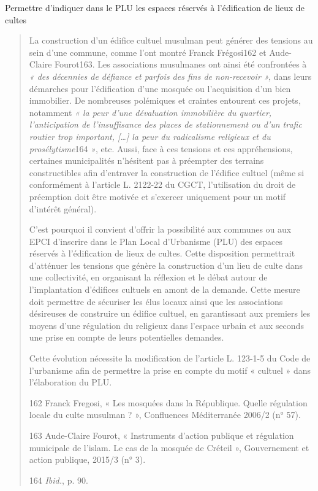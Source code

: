 Permettre d'indiquer dans le PLU les espaces réservés à l'édification de
lieux de cultes

\begin{quote}
La construction d'un édifice cultuel musulman peut générer des tensions
au sein d'une commune, comme l'ont montré Franck Frégosi162 et
Aude-Claire Fourot163. Les associations musulmanes ont ainsi été
confrontées à \emph{« des décennies de défiance et parfois des fins de
non-recevoir »,} dans leurs démarches pour l'édification d'une mosquée
ou l'acquisition d'un bien immobilier. De nombreuses polémiques et
craintes entourent ces projets, notamment \emph{« la peur d'une
dévaluation immobilière du quartier, l'anticipation de l'insuffisance
des places de stationnement ou d'un trafic routier trop important,
{[}\ldots{]} la peur du radicalisme religieux et du prosélytisme}164
\emph{»}, etc. Aussi, face à ces tensions et ces appréhensions,
certaines municipalités n'hésitent pas à préempter des terrains
constructibles afin d'entraver la construction de l'édifice cultuel
(même si conformément à l'article L. 2122-22 du CGCT, l'utilisation du
droit de préemption doit être motivée et s'exercer uniquement pour un
motif d'intérêt général).

C'est pourquoi il convient d'offrir la possibilité aux communes ou aux
EPCI d'inscrire dans le Plan Local d'Urbanisme (PLU) des espaces
réservés à l'édification de lieux de cultes. Cette disposition
permettrait d'atténuer les tensions que génère la construction d'un lieu
de culte dans une collectivité, en organisant la réflexion et le débat
autour de l'implantation d'édifices cultuels en amont de la demande.
Cette mesure doit permettre de sécuriser les élus locaux ainsi que les
associations désireuses de construire un édifice cultuel, en
garantissant aux premiers les moyens d'une régulation du religieux dans
l'espace urbain et aux seconds une prise en compte de leurs potentielles
demandes.

Cette évolution nécessite la modification de l'article L. 123-1-5 du
Code de l'urbanisme afin de permettre la prise en compte du motif «
cultuel » dans l'élaboration du PLU.

162 Franck Fregosi, « Les mosquées dans la République. Quelle régulation
locale du culte musulman ? », Confluences Méditerranée 2006/2 (n° 57).

163 Aude-Claire Fourot, « Instruments d'action publique et régulation
municipale de l'islam. Le cas de la mosquée de Créteil », Gouvernement
et action publique, 2015/3 (n° 3).

164 \emph{Ibid.}, p. 90.


\end{quote}

